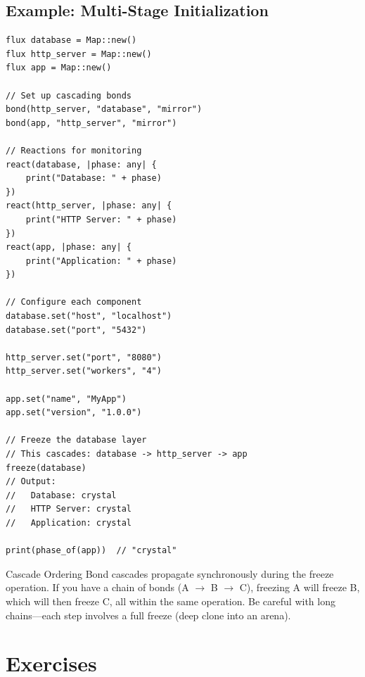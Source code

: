 \subsection{Example: Multi-Stage Initialization}

\begin{lstlisting}[language=Lattice, caption={Multi-stage initialization with bonds}]
flux database = Map::new()
flux http_server = Map::new()
flux app = Map::new()

// Set up cascading bonds
bond(http_server, "database", "mirror")
bond(app, "http_server", "mirror")

// Reactions for monitoring
react(database, |phase: any| {
    print("Database: " + phase)
})
react(http_server, |phase: any| {
    print("HTTP Server: " + phase)
})
react(app, |phase: any| {
    print("Application: " + phase)
})

// Configure each component
database.set("host", "localhost")
database.set("port", "5432")

http_server.set("port", "8080")
http_server.set("workers", "4")

app.set("name", "MyApp")
app.set("version", "1.0.0")

// Freeze the database layer
// This cascades: database -> http_server -> app
freeze(database)
// Output:
//   Database: crystal
//   HTTP Server: crystal
//   Application: crystal

print(phase_of(app))  // "crystal"
\end{lstlisting}

\begin{warnbox}{Cascade Ordering}
Bond cascades propagate synchronously during the freeze operation.
If you have a chain of bonds (A $\to$ B $\to$ C), freezing A will freeze B, which will then freeze C, all within the same operation.
Be careful with long chains---each step involves a full freeze (deep clone into an arena).
\end{warnbox}

\section{Exercises}\label{sec:ch13-exercises}

